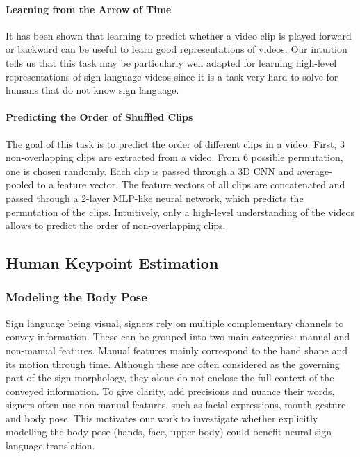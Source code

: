 \documentclass[final]{cvpr}
\begin{document}
\paragraph{Learning from the Arrow of Time}
It has been shown \cite{arrow} that learning to predict whether a video clip is played forward or backward can be useful to learn good representations of videos. Our intuition tells us that this task may be particularly well adapted for learning high-level representations of sign language videos since it is a task very hard to solve for humans that do not know sign language.
\paragraph{Predicting the Order of Shuffled Clips}
The goal of this task is to predict the order of different clips in a video. First, 3 non-overlapping clips are extracted from a video. From 6 possible permutation, one is chosen randomly. Each clip is passed through a 3D CNN and average-pooled to a feature vector. The feature vectors of all clips are concatenated and passed through a 2-layer MLP-like neural network, which predicts the permutation of the clips. Intuitively, only a high-level understanding of the videos allows to predict the order of non-overlapping clips.
\subsection{Human Keypoint Estimation}
\subsubsection{Modeling the Body Pose}
Sign language being visual, signers rely on multiple complementary channels to convey information. These can be grouped into two main categories: manual and non-manual features. Manual features mainly correspond to the hand shape and its motion through time. Although these are often considered as the governing part of the sign morphology, they alone do not enclose the full context of the conveyed information. To give clarity, add precisions and nuance their words, signers often use non-manual features, such as facial expressions, mouth gesture and body pose. This motivates our work to investigate whether explicitly modelling the body pose (hands, face, upper body) could benefit neural sign language translation.
\end{document}
